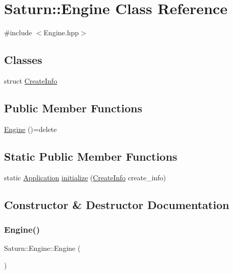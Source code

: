 \hypertarget{class_saturn_1_1_engine}{}\section{Saturn\+:\+:Engine Class Reference}
\label{class_saturn_1_1_engine}


{\ttfamily \#include $<$Engine.\+hpp$>$}

\subsection*{Classes}
\begin{DoxyCompactItemize}
\item 
struct \mbox{\hyperlink{struct_saturn_1_1_engine_1_1_create_info}{Create\+Info}}
\end{DoxyCompactItemize}
\subsection*{Public Member Functions}
\begin{DoxyCompactItemize}
\item 
\mbox{\hyperlink{class_saturn_1_1_engine_aa2a298194d2a4cd3c9e6a339d9fe4d1e}{Engine}} ()=delete
\end{DoxyCompactItemize}
\subsection*{Static Public Member Functions}
\begin{DoxyCompactItemize}
\item 
static \mbox{\hyperlink{class_saturn_1_1_application}{Application}} \mbox{\hyperlink{class_saturn_1_1_engine_acb3df3e4dbbafcef300403602d41e5fb}{initialize}} (\mbox{\hyperlink{struct_saturn_1_1_engine_1_1_create_info}{Create\+Info}} create\+\_\+info)
\end{DoxyCompactItemize}


\subsection{Constructor \& Destructor Documentation}
\mbox{\label{class_saturn_1_1_engine_aa2a298194d2a4cd3c9e6a339d9fe4d1e}} 
\subsubsection{\texorpdfstring{Engine()}{Engine()}}
{\footnotesize\ttfamily Saturn\+::\+Engine\+::\+Engine (\begin{DoxyParamCaption}{ }\end{DoxyParamCaption})\hspace{0.3cm}{\ttfamily [delete]}}



